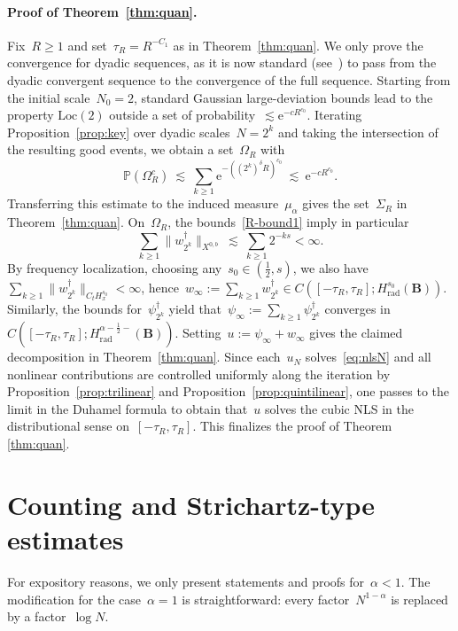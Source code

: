 \documentclass[11pt,reqno,english]{amsart}
\numberwithin{equation}{section}
\theoremstyle{plain}
\theoremstyle{definition}
\theoremstyle{remark}
\newcommand{\e}{\mathrm{e}}
\begin{document}
\paragraph{\bf Proof of Theorem~\ref{thm:quan}.}
Fix~$R\ge 1$ and set~$\tau_R=R^{-C_1}$ as in Theorem~\ref{thm:quan}. We only prove the convergence for dyadic sequences, as
it is now standard (see~\cite{DNY24,BCST24}) to pass from the dyadic convergent sequence to the convergence of the full sequence.
Starting from the initial scale~$N_0=2$,
standard Gaussian large-deviation bounds lead to the property $\mathrm{Loc}(2)$ outside a set of probability~$\lesssim \e^{-cR^{c_0}}$. Iterating Proposition~\ref{prop:key} over dyadic scales~$N=2^k$ and taking the intersection
of the resulting good events, we obtain a set~$\Omega_R$ with
\[
\mathbb{P}(\Omega_R^c)\ \lesssim\ \sum_{k\ge 1}\e^{-( (2^{k})^{\delta}R)^{c_0}}\ \lesssim\ \e^{-cR^{c_0}}.
\]
Transferring this estimate to the induced measure~$\mu_{\alpha}$ gives the set~$\Sigma_R$ in Theorem~\ref{thm:quan}.
On~$\Omega_R$, the bounds~\eqref{R-bound1} imply in particular
\[
\sum_{k\ge 1}\|w_{2^k}^{\dag}\|_{X^{0,b}}\ \lesssim\ \sum_{k\ge 1}2^{-ks}<\infty.
\]
By frequency localization, choosing any~$s_0\in(\frac12,s)$, we also have~$\sum_{k\ge 1}\|w_{2^k}^{\dag}\|_{C_tH_x^{s_0}}<\infty$, hence~$w_{\infty}:=\sum_{k\ge 1}w_{2^k}^{\dag}\in C([-\tau_R,\tau_R];H_{\mathrm{rad}}^{s_0}(\mathbf{B}))$.
Similarly, the bounds for~$\psi_{2^k}^{\dag}$ yield that~$\psi_{\infty}:=\sum_{k\ge 1}\psi_{2^k}^{\dag}$ converges in~$C([-\tau_R,\tau_R];H_{\mathrm{rad}}^{\alpha-\frac12-}(\mathbf{B}))$.
Setting~$u:=\psi_{\infty}+w_{\infty}$ gives the claimed decomposition in Theorem~\ref{thm:quan}.
Since each~$u_N$ solves~\eqref{eq:nlsN} and all nonlinear contributions are controlled uniformly along the
iteration by Proposition~\ref{prop:trilinear} and Proposition~\ref{prop:quintilinear},
one passes to the limit in the Duhamel formula to obtain that~$u$ solves the cubic NLS
in the distributional sense on~$[-\tau_R,\tau_R]$.
This finalizes the proof of Theorem \ref{thm:quan}.
	
	
	
	
	
	\section{Counting and Strichartz-type estimates}\label{sec:detertool}

For expository reasons, we only present statements and proofs for~$\alpha<1$. The modification for the case~$\alpha=1$ is straightforward: every factor~$N^{1-\alpha}$ is replaced by a factor~$\log N$.
\end{document}
